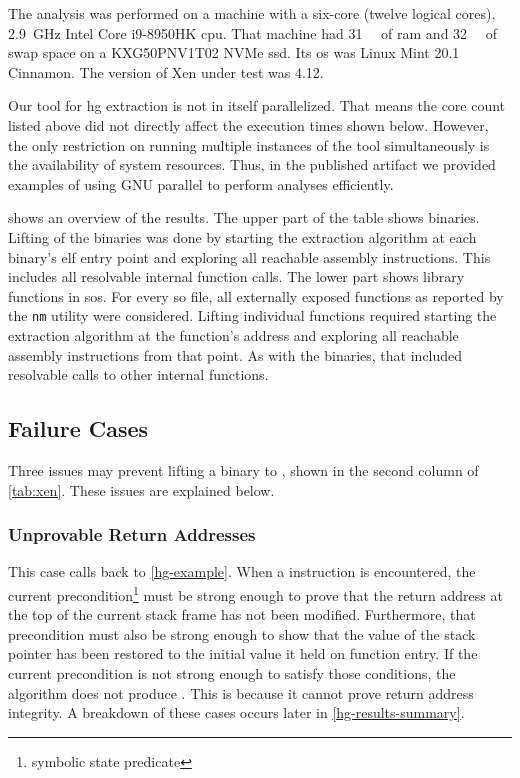 The analysis was performed on a machine with a six-core (twelve logical cores), \SI{2.9}{\giga\hertz} Intel Core i9-8950HK \ac{cpu}.
That machine had \SI{31}{\gibi\byte} of \ac{ram}
and \SI{32}{\gibi\byte} of swap space on a KXG50PNV1T02 NVMe \ac{ssd}.
Its \ac{os} was Linux Mint 20.1 Cinnamon.
The version of Xen under test was 4.12.
\begin{remark}[Parallelization]
  Our tool for \ac{hg} extraction is not in itself parallelized.
  That means the core count listed above did not directly affect the execution times shown below.
  However, the only restriction on running multiple instances of the tool simultaneously is the availability of system resources.
  Thus, in the published artifact \autocite{bockenek2022artifact} we provided examples of using GNU parallel \autocite{Tange2011a} to perform analyses efficiently.
\end{remark}

 shows an overview of the results.
The upper part of the table shows binaries.
Lifting of the binaries was done by starting the extraction algorithm at each binary's \ac{elf} entry point and exploring all reachable assembly instructions.
This includes all resolvable internal function calls.
The lower part shows library functions in \acp{so}.
For every \ac{so} file, all externally exposed functions as reported by the \lstinline|nm| utility were considered.
Lifting individual functions required starting the extraction algorithm at the function's address and exploring all reachable assembly instructions from that point.
As with the binaries, that included resolvable calls to other internal functions.

\subsection{Failure Cases}\label{sec:failure}
Three issues may prevent lifting a binary to , shown in the second column of \cref{tab:xen}.
These issues are explained below.

\subsubsection{Unprovable Return Addresses}
This case calls back to \cref{hg-example}.
When a  instruction is encountered,
the current precondition\footnote{symbolic state predicate}
must be strong enough to prove that the return address at the top of the current stack frame has not been modified.
Furthermore, that precondition must also be strong enough to show that the value of the stack pointer has been restored to the initial value it held on function entry.
If the current precondition is not strong enough to satisfy those conditions, the algorithm does not produce .
This is because it cannot prove return address integrity.
A breakdown of these cases occurs later in \cref{hg-results-summary}.

